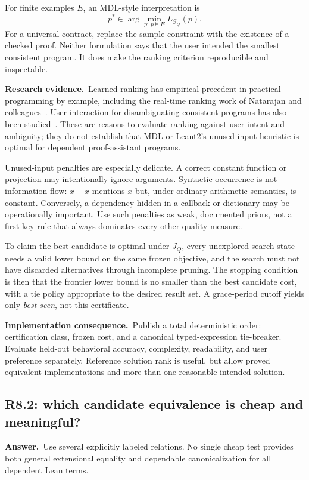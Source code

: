 \documentclass[11pt,a4paper]{article}
\theoremstyle{definition}
\theoremstyle{remark}
\newcommand{\ans}{\noindent\textbf{Answer.}\ }
\newcommand{\imp}{\par\noindent\textbf{Implementation consequence.}\ }
\newcommand{\lit}{\par\noindent\textbf{Research evidence.}\ }
\begin{document}
For finite examples $E$, an MDL-style interpretation is
\[
 p^*\in\arg\min_{p:\,p\models E} L_{\mathcal G_Q}(p).
\]
For a universal contract, replace the sample constraint with the existence of
a checked proof. Neither formulation says that the user intended the smallest
consistent program. It does make the ranking criterion reproducible and
inspectable.

\lit Learned ranking has empirical precedent in practical programming by
example, including the real-time ranking work of Natarajan and
colleagues~\cite{ranking-study}. User interaction for disambiguating consistent
programs has also been studied~\cite{pbe-interaction}. These are reasons to
evaluate ranking against user intent and ambiguity; they do not establish that
MDL or Leant2's unused-input heuristic is optimal for dependent proof-assistant
programs.

Unused-input penalties are especially delicate. A correct constant function
or projection may intentionally ignore arguments. Syntactic occurrence is not
information flow: $x-x$ mentions $x$ but, under ordinary arithmetic semantics,
is constant. Conversely, a dependency hidden in a callback or dictionary may
be operationally important. Use such penalties as weak, documented priors,
not a first-key rule that always dominates every other quality measure.

To claim the best candidate is optimal under $J_Q$, every unexplored search
state needs a valid lower bound on the same frozen objective, and the search
must not have discarded alternatives through incomplete pruning. The stopping
condition is then that the frontier lower bound is no smaller than the best
candidate cost, with a tie policy appropriate to the desired result set.
A grace-period cutoff yields only \emph{best seen}, not this certificate.

\imp Publish a total deterministic order: certification class, frozen cost,
and a canonical typed-expression tie-breaker. Evaluate held-out behavioral
accuracy, complexity, readability, and user preference separately. Reference
solution rank is useful, but allow proved equivalent implementations and more
than one reasonable intended solution.

\subsection{R8.2: which candidate equivalence is cheap and meaningful?}\label{q:R8.2}
\ans Use several explicitly labeled relations. No single cheap test provides
both general extensional equality and dependable canonicalization for all
dependent Lean terms.
\end{document}
